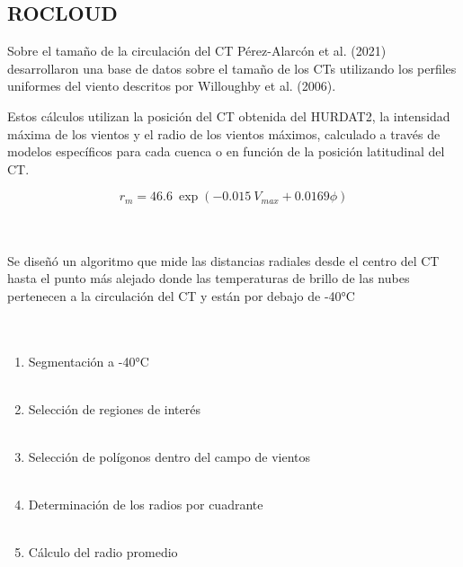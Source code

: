 \subsection{ROCLOUD}
\begin{frame}
    \begin{block}{Sobre el tamaño de la circulación del CT}
        Pérez-Alarcón et al. (2021) desarrollaron una base de datos sobre el tamaño de los CTs utilizando los perfiles uniformes del viento descritos por Willoughby et al. (2006). \bigskip

        Estos cálculos utilizan la posición del CT obtenida del HURDAT2, la intensidad máxima de los vientos y el radio de los vientos máximos, calculado a través de modelos específicos para cada cuenca o en función de la posición latitudinal del CT.

    \begin{equation}
        \label{eq:2.1}
        r_{m} =  46.6 \ \exp{(-0.015 \ V_{max} + 0.0169 \phi)}
    \end{equation}
        \\~\
    \end{block}

\end{frame}

\begin{frame}
    Se diseñó un algoritmo que mide las distancias radiales desde el centro del CT hasta el punto más alejado donde las temperaturas de brillo de las nubes pertenecen a la circulación del CT y están por debajo de -40°C
    \\~\ 
    \\~\ 
\begin{enumerate}
    \item<1-> Segmentación a -40°C
     \\~\
    \item<2-> Selección de regiones de interés
     \\~\
    \item<3-> Selección de polígonos dentro del campo de vientos
     \\~\
    \item<4-> Determinación de los radios por cuadrante
     \\~\
    \item<4-> Cálculo del radio promedio
\end{enumerate}
\end{frame}

